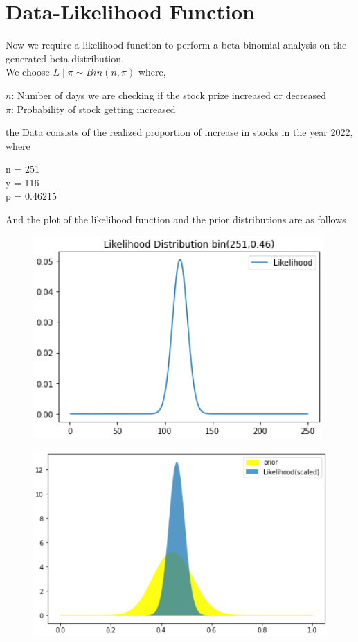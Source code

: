 \documentclass[journal,12pt,twocolumn]{IEEEtran}
\begin{document}
\section{Data-Likelihood Function}
Now we require a likelihood function to perform a beta-binomial analysis on the generated beta distribution.\\
We choose $L \mid \pi \sim Bin(n,\pi)$ where,
\begin{center}
    $n$: Number of days we are checking if the stock prize increased or decreased \\
    $\pi$: Probability of stock getting increased
\end{center}
the Data consists of the realized proportion of increase in stocks in the year 2022, where
\begin{center}
    n = 251 \\
y = 116 \\
p = 0.46215
\end{center}
 And the plot of the likelihood function and the prior distributions are  as follows
\begin{figure}[!ht]
\centering
\includegraphics[width=\columnwidth]{Images/Likelihood_Dist.png}
\label{fig:yndft}
\end{figure}

\begin{figure}[!ht]
\centering
\includegraphics[width=\columnwidth]{Images/Prior_Likelihood.png}
\label{fig:yndft}
\end{figure}
\end{document}

